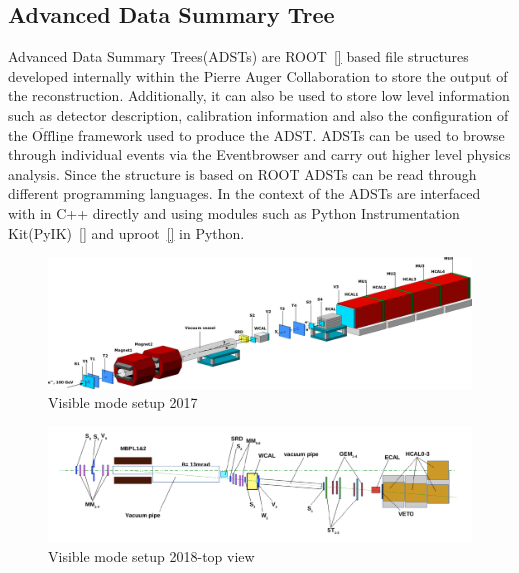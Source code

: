 \subsection{Advanced Data Summary Tree}
\label{sec:ADST}
Advanced Data Summary Trees(ADSTs) are ROOT~\ref{} based file structures developed internally within the Pierre Auger Collaboration to store the output of the reconstruction. Additionally, it can also be used to store low level information such as detector description, calibration information and also the configuration of the $\mathrm{\overline{Off}\underline{line}}$ framework used to produce the ADST. ADSTs can be used to browse through individual events via the Eventbrowser and carry out higher level physics analysis. Since the structure is based on ROOT ADSTs can be read through different programming languages. In the context of the ADSTs are interfaced with in C++ directly and using modules such as Python Instrumentation Kit(PyIK)~\ref{} and uproot~\ref{} in Python. 







\begin{figure}[t!]
\centering
\includegraphics[width=\textwidth]{thesis_figures/Visible_3d_setup.png}
\caption{Visible mode setup 2017~\cite{Banerjee_2018}}
\label{fig:Visible_mode_setup}
\end{figure}

\begin{figure}[t!]
\centering
\includegraphics[width=\textwidth]{thesis_figures/visible_mode_newest.png}
\caption{Visible mode setup 2018-top view~\cite{Gninenko:2677228}}
\label{fig:Visible_mode_setup_side}
\end{figure}



